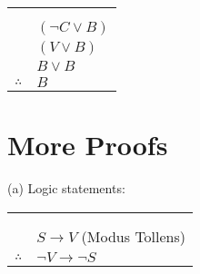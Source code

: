 \documentclass{article}
\begin{document}
\begin{tabular}{c@{\,}l@{}} 
                         & \\ & \\
                         & $(\neg C \vee B)$ \\
                         & $(V \vee B)$ \\
                         & $B \vee B$ \\
\arrayrulecolor{blue}
\cline{2-2}
    $\therefore$         & $B$ \\
\end{tabular}

\section{More Proofs}

(a) Logic statements:
\newline
\begin{tabular}{c@{\,}l@{}} 
                         & \\ & \\
                         & $S \rightarrow V$ (Modus Tollens) \\
\arrayrulecolor{blue}
\cline{2-2}
    $\therefore$         & $\neg V \rightarrow \neg S$ \\
\end{tabular}
\end{document}
